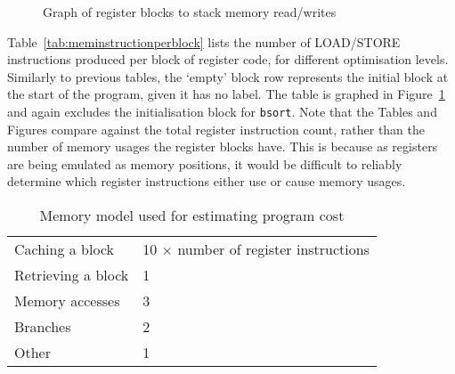 \begin{figure}
  \caption{Graph of register blocks to stack memory read/writes}
\label{fig:meminstructionperblock}
\end{figure}

Table~\ref{tab:meminstructionperblock} lists the number of LOAD/STORE
instructions produced per block of register code, for different optimisation
levels. Similarly to previous tables, the `empty' block row represents the
initial block at the start of the program, given it has no label. The table is
graphed in Figure~\ref{fig:meminstructionperblock} and again excludes the
initialisation block for \texttt{bsort}. Note that the Tables and Figures
compare against the total register instruction count, rather than the number of
memory usages the register blocks have. This is because as registers are being
emulated as memory positions, it would be difficult to reliably determine which
register instructions either use or cause memory usages.

\begin{table}
  \begin{tabular}{l l}
    Caching a block & 10 $\times$ number of register instructions \\
    Retrieving a block & 1 \\
    Memory accesses & 3 \\
    Branches & 2 \\
    Other & 1 \\
  \end{tabular}
  \caption{Memory model used for estimating program cost}\label{tab:memmodel}
\end{table}

